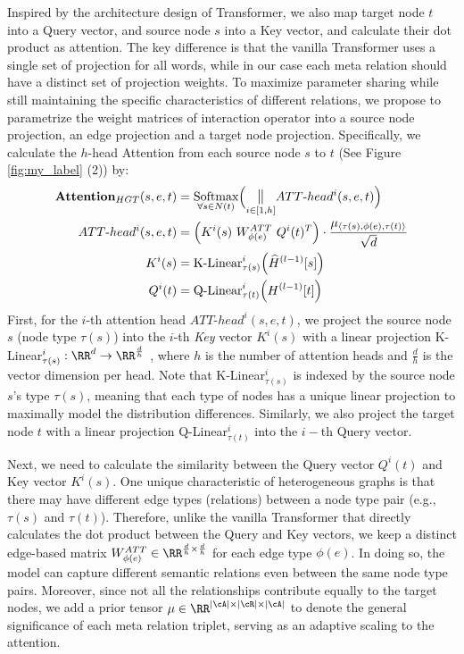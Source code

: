 \documentclass[sigconf]{acmart}
\theoremstyle{definition}
\begin{document}
{Inspired by the architecture design of Transformer, we also map target node $t$ into a Query vector, and source node $s$ into a Key vector, and calculate their dot product as attention. The key difference is that the vanilla Transformer uses a single set of projection for all words, while in our case each meta relation should have a distinct set of projection weights. To maximize parameter sharing while still maintaining the specific characteristics of different relations, we propose to parametrize the weight matrices of interaction operator into a source node projection, an edge projection and a target node projection. Specifically, we calculate the $h$-head {Attention} from each source node $s$ to $t$ (See Figure \ref{fig:my_label} (2)) by:
\begin{align}
\label{eq:hgt-att}
\textbf{Attention}_{HGT}(s,e,t)&  = \underset{\forall s \in N(t)}{\text{Softmax}}\Big(\underset{i \in [1,h]}{\mathlarger{\mathbin\Vert}}ATT\text{-}head^{i}(s,e,t)\Big)\\
ATT\text{-}head^{i}(s,e,t)&  = \Big(K^i(s)\ W^{ATT}_{\phi(e)}\ Q^i(t)^T\Big) \cdot \frac{{\mu}_{\langle \tau(s), \phi(e), \tau(t) \rangle}}{\sqrt{d}} \nonumber\\
K^i(s)&  = \text{K-Linear}^i_{\tau(s)}\Big(\widehat{H}^{(l-1)}[s]\Big) \nonumber\\
Q^i(t)&  = \text{Q-Linear}^i_{\tau(t)}\Big(H^{(l-1)}[t]\Big) \nonumber
\end{align}
First, for the $i$-th attention head $ATT\text{-}head^{i}(s,e,t)$, we project the source node $s$ (node type $\tau(s)$) into the $i$-th \textit{Key} vector $K^i(s)$ with a linear projection K-Linear$^i_{\tau(s)}: \RR^{d} \rightarrow \RR^{\frac{d}{h}}$ , where $h$ is the number of attention heads and $\frac{d}{h}$ is the vector dimension per head. 
Note that K-Linear$^i_{\tau(s)}$ is indexed by the source node $s$'s type $\tau(s)$, meaning that each type of nodes has a unique linear projection to maximally model the distribution differences. 
Similarly, we also project the target node $t$ with a linear projection Q-Linear$^i_{\tau(t)}$ into the $i-$th Query vector. 



Next, we need to calculate the similarity between the Query vector $Q^i(t)$ and Key vector $K^i(s)$. 
One unique characteristic of heterogeneous graphs is that there may have different edge types (relations) between a node type pair (e.g., $\tau(s)$ and $\tau(t)$). 
Therefore, unlike the vanilla Transformer that directly calculates the dot product between the Query and Key vectors, we keep a distinct edge-based matrix $W^{ATT}_{\phi(e)}\in\RR^{\frac{d}{h}\times\frac{d}{h}}$ for each edge type $\phi(e)$. In doing so, the model can capture different semantic relations even between the same node type pairs. 
Moreover, since not all the relationships contribute equally to the target nodes, 
we add a prior tensor $\mu \in \RR^{|\cA|\times|\cR|\times|\cA|}$ to denote the general significance of each meta relation triplet, serving as an adaptive scaling to the attention. 

}
\end{document}
